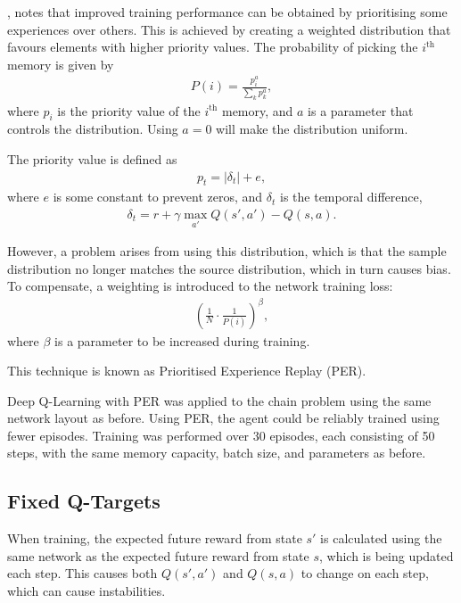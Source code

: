 \cite{Schaul:2015:Prioritized}, notes that improved training performance can be
obtained by prioritising some experiences over others.
This is achieved by creating a weighted distribution that favours elements with
higher priority values.
The probability of picking the $i^\text{th}$ memory is given by
\begin{align*}
    P(i) = \frac{p_i^a}{\sum_{k} p_k^a},
\end{align*}
where $p_i$ is the priority value of the $i^\text{th}$ memory, and $a$ is a
parameter that controls the distribution.
Using $a = 0$ will make the distribution uniform.

The priority value is defined as
\begin{align*}
    p_t = \left|\delta_t\right| + e,
\end{align*}
where $e$ is some constant to prevent zeros, and $\delta_t$ is the temporal
difference,
\begin{align*}
    \delta_t = r + \gamma\max_{a'}Q(s',a') - Q(s,a).
\end{align*}

However, a problem arises from using this distribution, which is that the sample
distribution no longer matches the source distribution, which in turn causes
bias.
To compensate, a weighting is introduced to the network training loss:
\begin{align*}
    \left(\frac{1}{N}\cdot\frac{1}{P(i)}\right)^{\beta},
\end{align*}
where $\beta$ is a parameter to be increased during training.

This technique is known as Prioritised Experience Replay (PER).

Deep Q-Learning with PER was applied to the chain problem using the same
network layout as before.
Using PER, the agent could be reliably trained using fewer episodes.
Training was performed over 30 episodes, each consisting of 50 steps, with the
same memory capacity, batch size, and parameters as before.



\subsection{Fixed Q-Targets}

When training, the expected future reward from state $s'$ is calculated using
the same network as the expected future reward from state $s$, which is being
updated each step.
This causes both $Q(s',a')$ and $Q(s,a)$ to change on each step, which can cause
instabilities.

